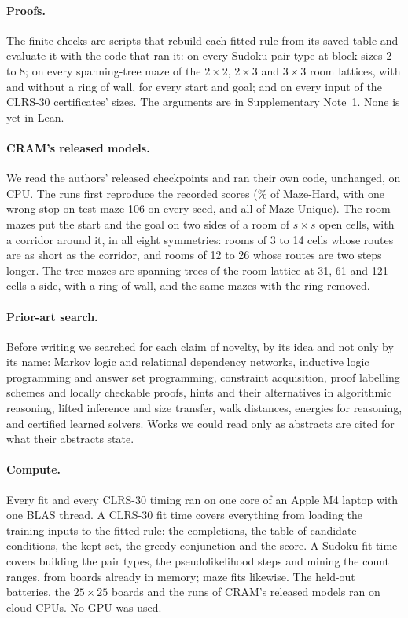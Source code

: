 \paragraph{Proofs.} The finite checks are scripts that rebuild each fitted rule from its saved table and evaluate it with
the code that ran it: on every Sudoku pair type at block sizes 2 to 8; on every spanning-tree maze of the $2\times2$,
$2\times3$ and $3\times3$ room lattices, with and without a ring of wall, for every start and goal; and on every input
of the CLRS-30 certificates' sizes. The arguments are in Supplementary Note~1. None is yet in Lean.

\paragraph{CRAM's released models.} We read the authors' released checkpoints and ran their own code, unchanged, on CPU.
The runs first reproduce the recorded scores (\% of Maze-Hard, with one wrong stop on test maze 106 on
every seed, and all of Maze-Unique). The room mazes put the start and the goal on two sides of a room of $s\times s$ open
cells, with a corridor around it, in all eight symmetries: rooms of 3 to 14 cells whose routes are as short as the
corridor, and rooms of 12 to 26 whose routes are two steps longer. The tree mazes are spanning trees of the room
lattice at 31, 61 and 121 cells a side, with a ring of wall, and the same mazes with the ring removed. 

\paragraph{Prior-art search.} Before writing we searched for each claim of novelty, by its idea and not only by its
name: Markov logic and relational dependency networks, inductive logic programming and answer set programming,
constraint acquisition, proof labelling schemes and locally checkable proofs, hints and their alternatives in
algorithmic reasoning, lifted inference and size transfer, walk distances, energies for reasoning, and certified
learned solvers. Works we could read only as abstracts are cited for what their abstracts state.

\paragraph{Compute.} Every fit and every CLRS-30 timing ran on one core of an Apple M4 laptop with one BLAS thread. A
CLRS-30 fit time covers everything from loading the training inputs to the fitted rule: the completions, the table of
candidate conditions, the kept set, the greedy conjunction and the score. A Sudoku fit time covers building the pair
types, the pseudolikelihood steps and mining the count ranges, from boards already in memory; maze fits likewise. The
held-out batteries, the $25\times25$ boards and the runs of CRAM's released models ran on cloud CPUs. No GPU was used.

